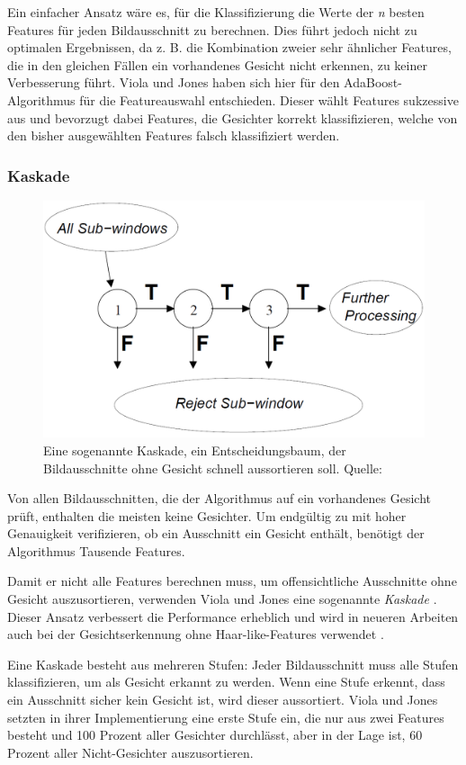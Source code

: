 \documentclass[doktyp=semarbeit, sprache=german]{TUBAFarbeiten}
\begin{document}
Ein einfacher Ansatz wäre es, für die Klassifizierung die Werte der \textit{n} besten Features für jeden Bildausschnitt zu berechnen. Dies führt jedoch nicht zu optimalen Ergebnissen, da z. B. die Kombination zweier sehr ähnlicher Features, die in den gleichen Fällen ein vorhandenes Gesicht nicht erkennen, zu keiner Verbesserung führt. Viola und Jones haben sich hier für den AdaBoost-Algorithmus für die Featureauswahl entschieden. Dieser wählt Features sukzessive aus und bevorzugt dabei Features, die Gesichter korrekt klassifizieren, welche von den bisher ausgewählten Features falsch klassifiziert werden.

\subsubsection{Kaskade}
\begin{figure}
	\centering
	\includegraphics[width=0.7\linewidth]{images/cascade}
	\caption[Kaskade]{Eine sogenannte Kaskade, ein Entscheidungsbaum, der Bildausschnitte ohne Gesicht schnell aussortieren soll. Quelle: \cite{Viola01rapidobject}}
	\label{fig:cascade}
\end{figure}


Von allen Bildausschnitten, die der Algorithmus auf ein vorhandenes Gesicht prüft, enthalten die meisten keine Gesichter. Um endgültig zu mit hoher Genauigkeit verifizieren, ob ein Ausschnitt ein Gesicht enthält, benötigt der Algorithmus Tausende Features.

Damit er nicht alle Features berechnen muss, um offensichtliche Ausschnitte ohne Gesicht auszusortieren, verwenden Viola und Jones eine sogenannte \textit{Kaskade} \cite{Viola01rapidobject}. Dieser Ansatz verbessert die Performance erheblich und wird in neueren Arbeiten auch bei der Gesichtserkennung ohne Haar-like-Features verwendet \cite{Li_2015_CVPR}.

Eine Kaskade besteht aus mehreren Stufen: Jeder Bildausschnitt muss alle Stufen klassifizieren, um als Gesicht erkannt zu werden. Wenn eine Stufe erkennt, dass ein Ausschnitt sicher kein Gesicht ist, wird dieser aussortiert. Viola und Jones setzten in ihrer Implementierung eine erste Stufe ein, die nur aus zwei Features besteht und 100 Prozent aller Gesichter durchlässt, aber in der Lage ist, 60 Prozent aller Nicht-Gesichter auszusortieren.
\end{document}
